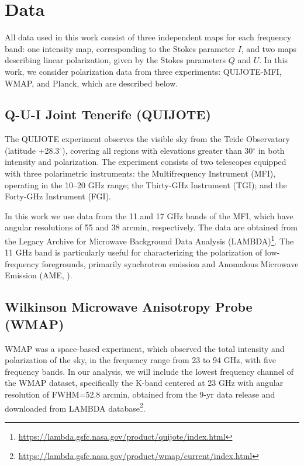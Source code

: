 \section{Data}
\label{sec:data}


All data used in this work consist of three independent maps for each frequency band: one intensity map, corresponding to the Stokes parameter $I$, and two maps describing linear polarization, given by the Stokes parameters $Q$ and $U$. In this work, we consider polarization data from three experiments: QUIJOTE-MFI, WMAP, and Planck, which are described below.


\subsection{Q-U-I Joint Tenerife (QUIJOTE)}

The QUIJOTE experiment \citep{QUIJOTE_IV} observes the visible sky from the Teide Observatory (latitude +28.3$^{\circ}$), covering all regions with elevations greater than 30$^{\circ}$ in both intensity and polarization. The experiment consists of two telescopes equipped with three polarimetric instruments: the Multifrequency Instrument (MFI), operating in the 10--20 GHz range; the Thirty-GHz Instrument (TGI); and the Forty-GHz Instrument (FGI).

In this work we use data from the 11 and 17 GHz bands of the MFI, which have angular resolutions of 55 and 38 arcmin, respectively. The data are obtained from the Legacy Archive for Microwave Background Data Analysis (LAMBDA)\footnote{\url{https://lambda.gsfc.nasa.gov/product/quijote/index.html}}. The 11 GHz band is particularly useful for characterizing the polarization of low-frequency foregrounds, primarily synchrotron emission \citep{QUIJOTE_XIX, casas_2025} and Anomalous Microwave Emission (AME, \citealp{QUIJOTE_X, QUIJOTE_XVIII}).

\subsection{Wilkinson Microwave Anisotropy Probe (WMAP)} 

WMAP was a space-based experiment, which observed the total intensity and polarization of the sky, in the frequency range from 23 to 94 GHz, with five frequency
bands. In our analysis, we will include the lowest frequency channel of the WMAP dataset, specifically the K-band centered at 23 GHz with angular resolution of FWHM=52.8 arcmin, obtained from the 9-yr data release  and downloaded from LAMBDA database\footnote{\url{https://lambda.gsfc.nasa.gov/product/wmap/current/index.html}}. 

